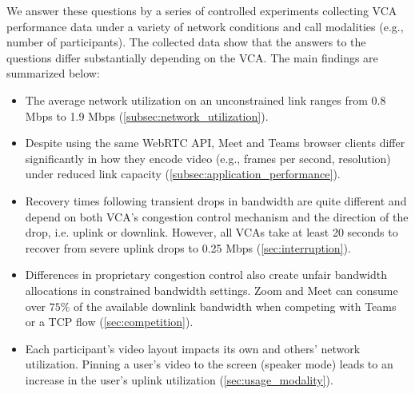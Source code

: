 We answer these questions by a series of controlled experiments collecting VCA performance data under a variety of network conditions and call modalities (e.g., number of participants). The collected data show that the answers to the questions differ substantially depending on the VCA. The main findings are summarized below:%
\begin{itemize}[noitemsep]
    \item The average network utilization on an unconstrained link ranges from 0.8 Mbps to 1.9 Mbps (\cref{subsec:network_utilization}). 
    \item Despite using the same WebRTC API, Meet and Teams browser clients differ significantly in how they encode video (e.g., frames per second, resolution) under reduced link capacity (\cref{subsec:application_performance}).
    \item Recovery times following transient drops in bandwidth are quite different and depend on both VCA's congestion control mechanism and the direction of the drop, i.e. uplink or downlink. However, all VCAs take at least 20 seconds to recover from severe uplink drops to 0.25 Mbps (\cref{sec:interruption}).
    \item Differences in proprietary congestion control also create unfair bandwidth allocations in constrained bandwidth settings. Zoom and Meet can consume over $75\%$ of the available downlink bandwidth when competing with Teams or a TCP flow (\cref{sec:competition}).
    \item Each participant's video layout impacts its own and others' network utilization. Pinning a user's video to the screen (speaker mode) leads to an increase in the user's uplink utilization (\cref{sec:usage_modality}). 
\end{itemize}




